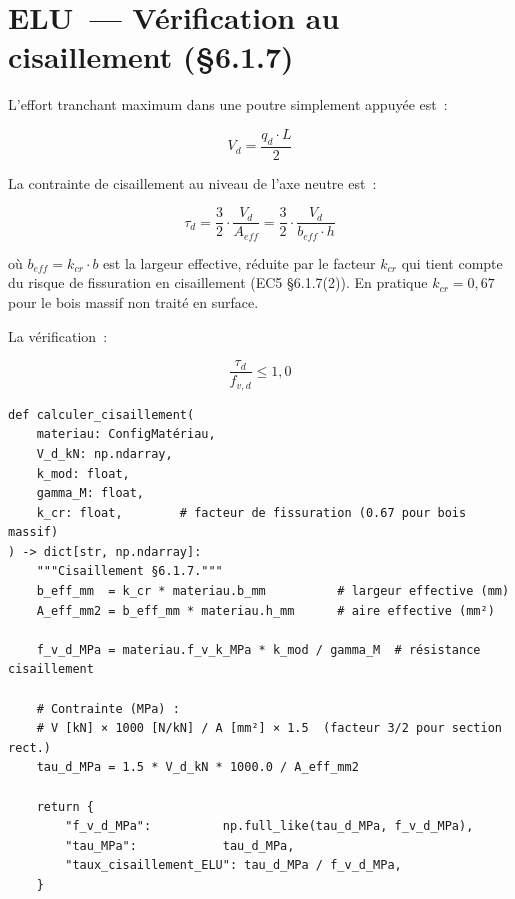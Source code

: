 \section{ELU~--- V\'erification au cisaillement (\S{}6.1.7)}

L'effort tranchant maximum dans une poutre simplement appuy\'ee est~:

\begin{equation}
V_{d} = \frac{q_d \cdot L}{2}
\end{equation}

La contrainte de cisaillement au niveau de l'axe neutre est~:

\begin{equation}
\tau_d = \frac{3}{2} \cdot \frac{V_d}{A_{eff}} = \frac{3}{2} \cdot \frac{V_d}{b_{eff} \cdot h}
\label{eq:tau}
\end{equation}

o\`u $b_{eff} = k_{cr} \cdot b$ est la largeur effective, r\'eduite
par le facteur $k_{cr}$ qui tient compte du risque de fissuration
en cisaillement (EC5 \S{}6.1.7(2)).
En pratique $k_{cr} = 0{,}67$ pour le bois massif non trait\'e
en surface.

La v\'erification~:

\begin{equation}
\frac{\tau_d}{f_{v,d}} \leq 1{,}0
\end{equation}

\begin{lstlisting}[style=python, caption={\fichier{ec5/elu.py} --- fonction \py{calculer\_cisaillement()}}]
def calculer_cisaillement(
    materiau: ConfigMatériau,
    V_d_kN: np.ndarray,
    k_mod: float,
    gamma_M: float,
    k_cr: float,        # facteur de fissuration (0.67 pour bois massif)
) -> dict[str, np.ndarray]:
    """Cisaillement §6.1.7."""
    b_eff_mm  = k_cr * materiau.b_mm          # largeur effective (mm)
    A_eff_mm2 = b_eff_mm * materiau.h_mm      # aire effective (mm²)

    f_v_d_MPa = materiau.f_v_k_MPa * k_mod / gamma_M  # résistance cisaillement

    # Contrainte (MPa) :
    # V [kN] × 1000 [N/kN] / A [mm²] × 1.5  (facteur 3/2 pour section rect.)
    tau_d_MPa = 1.5 * V_d_kN * 1000.0 / A_eff_mm2

    return {
        "f_v_d_MPa":          np.full_like(tau_d_MPa, f_v_d_MPa),
        "tau_MPa":            tau_d_MPa,
        "taux_cisaillement_ELU": tau_d_MPa / f_v_d_MPa,
    }
\end{lstlisting}


